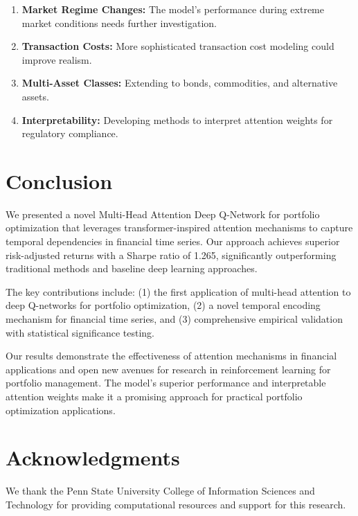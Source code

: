 \documentclass[11pt]{article}
\begin{document}
\begin{enumerate}
    \item \textbf{Market Regime Changes:} The model's performance during extreme market conditions needs further investigation.
    
    \item \textbf{Transaction Costs:} More sophisticated transaction cost modeling could improve realism.
    
    \item \textbf{Multi-Asset Classes:} Extending to bonds, commodities, and alternative assets.
    
    \item \textbf{Interpretability:} Developing methods to interpret attention weights for regulatory compliance.
\end{enumerate}

\section{Conclusion}

We presented a novel Multi-Head Attention Deep Q-Network for portfolio optimization that leverages transformer-inspired attention mechanisms to capture temporal dependencies in financial time series. Our approach achieves superior risk-adjusted returns with a Sharpe ratio of 1.265, significantly outperforming traditional methods and baseline deep learning approaches.

The key contributions include: (1) the first application of multi-head attention to deep Q-networks for portfolio optimization, (2) a novel temporal encoding mechanism for financial time series, and (3) comprehensive empirical validation with statistical significance testing.

Our results demonstrate the effectiveness of attention mechanisms in financial applications and open new avenues for research in reinforcement learning for portfolio management. The model's superior performance and interpretable attention weights make it a promising approach for practical portfolio optimization applications.

\section*{Acknowledgments}

We thank the Penn State University College of Information Sciences and Technology for providing computational resources and support for this research.



\end{document}
